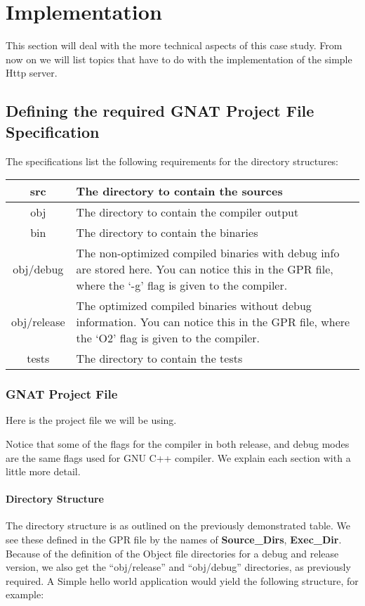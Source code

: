 \section{Implementation}
This section will deal with the more technical aspects of this case study. From now on we will list topics that have to do with the implementation of the simple Http server.

\subsection{Defining the required GNAT Project File Specification}
The specifications list the following requirements for the directory structures: 
\begin{center}
\begin{tabular}{|c|l|}
\hline
src & The directory to contain the sources \\ \hline
obj & The directory to contain the compiler output \\ \hline
bin & The directory to contain the binaries \\ \hline
obj/debug & \parbox{10cm}{The non-optimized compiled binaries with debug info are stored here. You can notice this in the GPR file, where the `-g' flag is given to the compiler.} \\ \hline
obj/release &  \parbox{10cm}{The optimized compiled binaries without debug information. You  can notice this in the GPR file, where the `O2' flag is given to the compiler.} \\ \hline
tests & The directory to contain the tests \\ \hline
\end{tabular}
\end{center}
\subsubsection{GNAT Project File}
Here is the project file we will be using.

Notice that some of the flags for the compiler in both release, and debug modes are the same flags used for GNU C++ compiler. We explain each section with a little more detail.

\paragraph{Directory Structure}The directory structure is as outlined on the previously demonstrated table. We see these defined in the GPR file by the names of \textbf{Source\_Dirs}, \textbf{Exec\_Dir}. Because of the definition of the Object file directories for a debug and release version, we also get the ``obj/release'' and ``obj/debug'' directories, as previously required. A Simple hello world application would yield the following structure, for example: 

